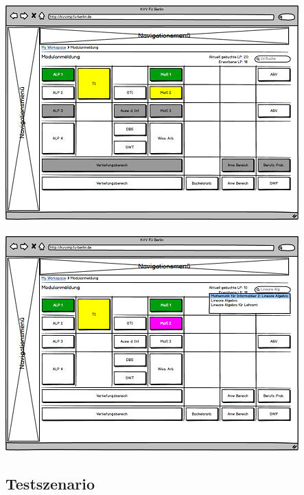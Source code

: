 \documentclass{article}
\begin{document}
\\
\includegraphics{img/ucd_ppt_mod_selected.png}\\
\\
\includegraphics{img/ucd_ppt_lv_search.png}\\
\newpage

\subsection{Testszenario}
\end{document}
